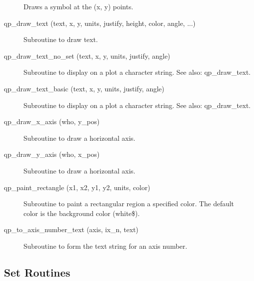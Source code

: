 \begin{description}
\item[\protect\parbox{6in}{qp_draw_symbols (x, y, units, type, height, color, \\
  \hspace*{2in} fill, line_width, clip, symbol_every)} ] \Newline 
     Draws a symbol at the (x, y) points. 

\item[qp_draw_text (text, x, y, units, justify, height, color, angle, ...) ] \Newline 
     Subroutine to draw text.

\item[qp_draw_text_no_set (text, x, y, units, justify, angle)] \Newline 
Subroutine to display on a plot a character string.
See also: qp_draw_text.

\item[qp_draw_text_basic (text, x, y, units, justify, angle)] \Newline 
     Subroutine to display on a plot a character string.
     See also: qp_draw_text.

\item[qp_draw_x_axis (who, y_pos)] \Newline 
     Subroutine to draw a horizontal axis.

\item[qp_draw_y_axis (who, x_pos)] \Newline 
     Subroutine to draw a horizontal axis.

\item[qp_paint_rectangle (x1, x2, y1, y2, units, color)] \Newline 
Subroutine to paint a rectangular region a specified color.
The default color is the background color (white\$).

\item[qp_to_axis_number_text (axis, ix_n, text)] \Newline 
     Subroutine to form the text string for an axis number.

\end{description}

\subsection{Set Routines}


